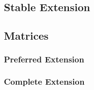 \subsection{Stable Extension}


\subsection{Matrices}
\subsubsection{Preferred Extension}
\subsubsection{Complete Extension}